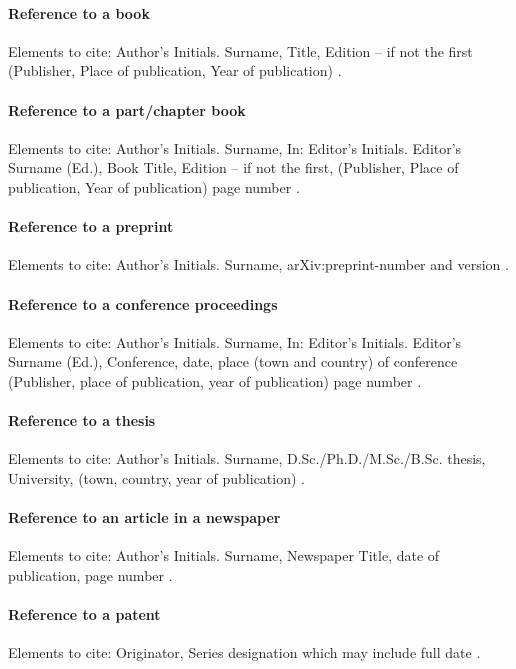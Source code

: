\paragraph{Reference to a book}
Elements to cite:
Author's Initials. Surname,
Title,
Edition -- if not the first
(Publisher, Place of publication, Year of publication)
\cite{book}.


\paragraph{Reference to a part/chapter book}
Elements to cite:
Author's Initials. Surname,
In: Editor's Initials. Editor's Surname (Ed.),
Book Title,
Edition -- if not the first,
(Publisher, Place of publication, Year of publication)
page number \cite{chapter}.


\paragraph{Reference to a preprint}
Elements to cite:
Author's Initials. Surname,
arXiv:preprint-number and version \cite{arxiv-1,arxiv-2}.

\paragraph{Reference to a conference proceedings}
Elements to cite:
Author's Initials. Surname,
In: Editor's Initials. Editor's Surname (Ed.),
Conference,
date, place (town and country) of conference
(Publisher, place of publication, year of publication)
page number \cite{proceedings}.


\paragraph{Reference to a thesis}
Elements to cite:
Author's Initials. Surname,
D.Sc./Ph.D./M.Sc./B.Sc. thesis,
University,
(town, country, year of publication) \cite{thesis}.


\paragraph{Reference to an article in a newspaper}
Elements to cite:
Author's Initials. Surname,
Newspaper Title,
date of publication,
page number \cite{newspaper-1,newspaper-2}.


\paragraph{Reference to a patent}
Elements to cite:
Originator,
Series designation which may include full date \cite{patent}.


